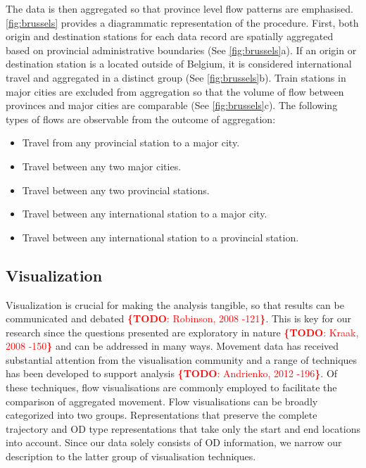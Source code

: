 \documentclass{sig-alternate}
\newcommand{\todo}[1]{\noindent\textcolor{red}{{\bf \{TODO}: #1{\bf \}}}}
\begin{document}
The data is then aggregated so that province level flow patterns are emphasised.
\cref{fig:brussels} provides a diagrammatic representation of the procedure.
First, both origin and destination stations for each data record are spatially aggregated based on provincial administrative boundaries (See \cref{fig:brussels}a).
If an origin or destination station is a located outside of Belgium, it is considered international travel and aggregated in a distinct group (See \cref{fig:brussels}b).
Train stations in major cities are excluded from aggregation so that the volume of flow between provinces and major cities are comparable (See \cref{fig:brussels}c).
The following types of flows are observable from the outcome of aggregation:

\begin{itemize}
  \item Travel from any provincial station to a major city.
  \item Travel between any two major cities.
  \item Travel between any two provincial stations.
  \item Travel between any international station to a major city.
  \item Travel between any international station to a provincial station.
\end{itemize}

\subsection{Visualization}

Visualization is crucial for making the analysis tangible, so that results can be communicated and debated \todo{Robinson, 2008 -121}. 
This is key for our research since the questions presented are exploratory in nature \todo{Kraak, 2008 -150} and can be addressed in many ways. 
Movement data has received substantial attention from the visualisation community and a range of techniques has been developed to support analysis \todo{Andrienko, 2012 -196}. 
Of these techniques, flow visualisations are commonly employed to facilitate the comparison of aggregated movement. 
Flow visualisations can be broadly categorized into two groups. Representations that preserve the complete trajectory and OD type representations that take only the start and end locations into account.
Since our data solely consists of OD information, we narrow our description to the latter group of visualisation techniques.
\end{document}
